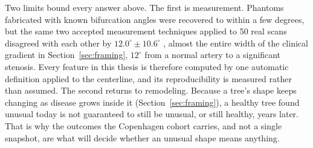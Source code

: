 Two limits bound every answer above.
The first is measurement.
Phantoms fabricated with known bifurcation angles were recovered to within a few degrees, but the
same two accepted measurement techniques applied to 50 real scans disagreed with each other by
$12.0^\circ \pm 10.6^\circ$ \cite{givehchi2018phantom}, almost the entire width of the clinical
gradient in Section~\ref{sec:framing}, $12^\circ$ from a normal artery to a significant stenosis.
Every feature in this thesis is therefore computed by one automatic definition applied to the
centerline, and its reproducibility is measured rather than assumed.
The second returns to remodeling.
Because a tree's shape keeps changing as disease grows inside it (Section~\ref{sec:framing}), a
healthy tree found unusual today is not guaranteed to still be unusual, or still healthy, years
later.
That is why the outcomes the Copenhagen cohort carries, and not a single snapshot, are what will
decide whether an unusual shape means anything.
